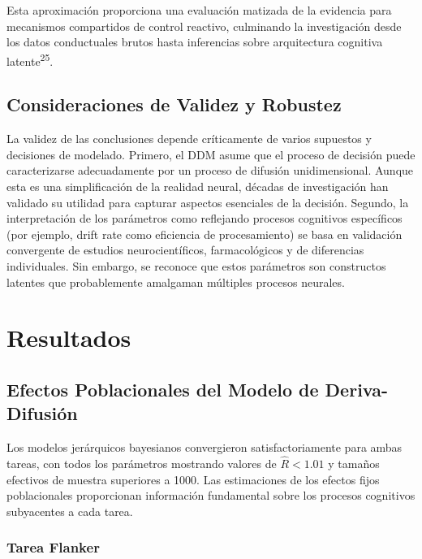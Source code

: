 \documentclass[
  spanish,
  10pt,
]{article}
\begin{document}
Esta aproximación proporciona una evaluación matizada de la evidencia
para mecanismos compartidos de control reactivo, culminando la
investigación desde los datos conductuales brutos hasta inferencias
sobre arquitectura cognitiva latente\textsuperscript{25}.

\subsection{Consideraciones de Validez y
Robustez}\label{consideraciones-de-validez-y-robustez}

La validez de las conclusiones depende críticamente de varios supuestos
y decisiones de modelado. Primero, el DDM asume que el proceso de
decisión puede caracterizarse adecuadamente por un proceso de difusión
unidimensional. Aunque esta es una simplificación de la realidad neural,
décadas de investigación han validado su utilidad para capturar aspectos
esenciales de la decisión. Segundo, la interpretación de los parámetros
como reflejando procesos cognitivos específicos (por ejemplo, drift rate
como eficiencia de procesamiento) se basa en validación convergente de
estudios neurocientíficos, farmacológicos y de diferencias individuales.
Sin embargo, se reconoce que estos parámetros son constructos latentes
que probablemente amalgaman múltiples procesos neurales.

\section{Resultados}\label{resultados}

\subsection{Efectos Poblacionales del Modelo de
Deriva-Difusión}\label{efectos-poblacionales-del-modelo-de-deriva-difusiuxf3n}

Los modelos jerárquicos bayesianos convergieron satisfactoriamente para
ambas tareas, con todos los parámetros mostrando valores de
\(\hat{R} < 1.01\) y tamaños efectivos de muestra superiores a 1000. Las
estimaciones de los efectos fijos poblacionales proporcionan información
fundamental sobre los procesos cognitivos subyacentes a cada tarea.

\subsubsection{Tarea Flanker}\label{tarea-flanker}
\end{document}
